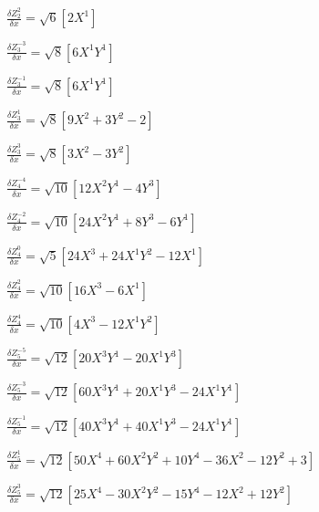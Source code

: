 \documentclass[10pt,landscape]{article}
\begin{document}
\vspace{1.2 mm}
\noindent $ \frac{\delta Z^{2}_{2}}{\delta x} = \sqrt{6} [2X^{1}] $

\vspace{1.2 mm}
\noindent $ \frac{\delta Z^{-3}_{3}}{\delta x} = \sqrt{8} [6X^{1}Y^{1}] $

\vspace{1.2 mm}
\noindent $ \frac{\delta Z^{-1}_{3}}{\delta x} = \sqrt{8} [6X^{1}Y^{1}] $

\vspace{1.2 mm}
\noindent $ \frac{\delta Z^{1}_{3}}{\delta x} = \sqrt{8} [9X^{2} +3Y^{2} -2] $

\vspace{1.2 mm}
\noindent $ \frac{\delta Z^{3}_{3}}{\delta x} = \sqrt{8} [3X^{2} -3Y^{2}] $

\vspace{1.2 mm}
\noindent $ \frac{\delta Z^{-4}_{4}}{\delta x} = \sqrt{10} [12X^{2}Y^{1} -4Y^{3}] $

\vspace{1.2 mm}
\noindent $ \frac{\delta Z^{-2}_{4}}{\delta x} = \sqrt{10} [24X^{2}Y^{1} +8Y^{3} -6Y^{1}] $

\vspace{1.2 mm}
\noindent $ \frac{\delta Z^{0}_{4}}{\delta x} = \sqrt{5} [24X^{3} +24X^{1}Y^{2} -12X^{1}] $

\vspace{1.2 mm}
\noindent $ \frac{\delta Z^{2}_{4}}{\delta x} = \sqrt{10} [16X^{3} -6X^{1}] $

\vspace{1.2 mm}
\noindent $ \frac{\delta Z^{4}_{4}}{\delta x} = \sqrt{10} [4X^{3} -12X^{1}Y^{2}] $

\vspace{1.2 mm}
\noindent $ \frac{\delta Z^{-5}_{5}}{\delta x} = \sqrt{12} [20X^{3}Y^{1} -20X^{1}Y^{3}] $

\vspace{1.2 mm}
\noindent $ \frac{\delta Z^{-3}_{5}}{\delta x} = \sqrt{12} [60X^{3}Y^{1} +20X^{1}Y^{3} -24X^{1}Y^{1}] $

\vspace{1.2 mm}
\noindent $ \frac{\delta Z^{-1}_{5}}{\delta x} = \sqrt{12} [40X^{3}Y^{1} +40X^{1}Y^{3} -24X^{1}Y^{1}] $

\vspace{1.2 mm}
\noindent $ \frac{\delta Z^{1}_{5}}{\delta x} = \sqrt{12} [50X^{4} +60X^{2}Y^{2} +10Y^{4} -36X^{2} -12Y^{2} +3] $

\vspace{1.2 mm}
\noindent $ \frac{\delta Z^{3}_{5}}{\delta x} = \sqrt{12} [25X^{4} -30X^{2}Y^{2} -15Y^{4} -12X^{2} +12Y^{2}] $
\end{document}
